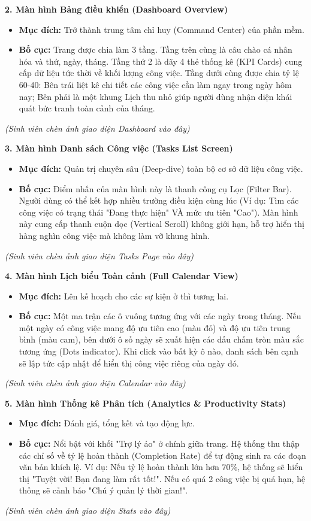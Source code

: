 \textbf{2. Màn hình Bảng điều khiển (Dashboard Overview)}
\begin{itemize}
    \item \textbf{Mục đích:} Trở thành trung tâm chỉ huy (Command Center) của phần mềm.
    \item \textbf{Bố cục:} Trang được chia làm 3 tầng. Tầng trên cùng là câu chào cá nhân hóa và thứ, ngày, tháng. Tầng thứ 2 là dãy 4 thẻ thống kê (KPI Cards) cung cấp dữ liệu tức thời về khối lượng công việc. Tầng dưới cùng được chia tỷ lệ 60-40: Bên trái liệt kê chi tiết các công việc cần làm ngay trong ngày hôm nay; Bên phải là một khung Lịch thu nhỏ giúp người dùng nhận diện khái quát bức tranh toàn cảnh của tháng.
\end{itemize}
\textit{(Sinh viên chèn ảnh giao diện Dashboard vào đây)}

\textbf{3. Màn hình Danh sách Công việc (Tasks List Screen)}
\begin{itemize}
    \item \textbf{Mục đích:} Quản trị chuyên sâu (Deep-dive) toàn bộ cơ sở dữ liệu công việc.
    \item \textbf{Bố cục:} Điểm nhấn của màn hình này là thanh công cụ Lọc (Filter Bar). Người dùng có thể kết hợp nhiều trường điều kiện cùng lúc (Ví dụ: Tìm các công việc có trạng thái "Đang thực hiện" VÀ mức ưu tiên "Cao"). Màn hình này cung cấp thanh cuộn dọc (Vertical Scroll) không giới hạn, hỗ trợ hiển thị hàng nghìn công việc mà không làm vỡ khung hình.
\end{itemize}
\textit{(Sinh viên chèn ảnh giao diện Tasks Page vào đây)}

\textbf{4. Màn hình Lịch biểu Toàn cảnh (Full Calendar View)}
\begin{itemize}
    \item \textbf{Mục đích:} Lên kế hoạch cho các sự kiện ở thì tương lai.
    \item \textbf{Bố cục:} Một ma trận các ô vuông tương ứng với các ngày trong tháng. Nếu một ngày có công việc mang độ ưu tiên cao (màu đỏ) và độ ưu tiên trung bình (màu cam), bên dưới ô số ngày sẽ xuất hiện các dấu chấm tròn màu sắc tương ứng (Dots indicator). Khi click vào bất kỳ ô nào, danh sách bên cạnh sẽ lập tức cập nhật để hiển thị công việc riêng của ngày đó.
\end{itemize}
\textit{(Sinh viên chèn ảnh giao diện Calendar vào đây)}

\textbf{5. Màn hình Thống kê Phân tích (Analytics \& Productivity Stats)}
\begin{itemize}
    \item \textbf{Mục đích:} Đánh giá, tổng kết và tạo động lực.
    \item \textbf{Bố cục:} Nổi bật với khối "Trợ lý ảo" ở chính giữa trang. Hệ thống thu thập các chỉ số về tỷ lệ hoàn thành (Completion Rate) để tự động sinh ra các đoạn văn bản khích lệ. Ví dụ: Nếu tỷ lệ hoàn thành lớn hơn 70\%, hệ thống sẽ hiển thị "Tuyệt vời! Bạn đang làm rất tốt!". Nếu có quá 2 công việc bị quá hạn, hệ thống sẽ cảnh báo "Chú ý quản lý thời gian!".
\end{itemize}
\textit{(Sinh viên chèn ảnh giao diện Stats vào đây)}

